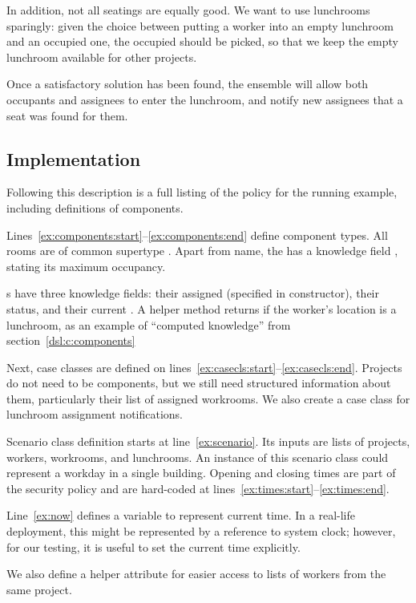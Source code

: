 In addition, not all seatings are equally good. We want to use lunchrooms sparingly:
given the choice between putting a worker into an empty lunchroom and an occupied one,
the occupied should be picked, so that we keep the empty lunchroom available for other
projects.

Once a satisfactory solution has been found, the ensemble will allow both occupants and
assignees to enter the lunchroom, and notify new assignees that a seat was found for
them.


\subsection{Implementation}

Following this description is a full listing of the policy for the running example,
including definitions of components.

Lines~\ref{ex:components:start}--\ref{ex:components:end} define component types. All
rooms are of common supertype . Apart from name, the  has a
knowledge field , stating its maximum occupancy.

s have three knowledge fields: their assigned  (specified in
constructor), their  status, and their current . A helper method
 returns  if the worker's location is a lunchroom, as an
example of ``computed knowledge'' from section~\ref{dsl:c:components}

Next, case classes are defined on lines~\ref{ex:casecls:start}--\ref{ex:casecls:end}.
Projects do not need to be components, but we still need structured information about
them, particularly their list of assigned workrooms. We also create a case class for
lunchroom assignment notifications.

Scenario class definition starts at line~\ref{ex:scenario}. Its inputs are lists of
projects, workers, workrooms, and lunchrooms. An instance of this scenario class could
represent a workday in a single building. Opening and closing times are part of the
security policy and are hard-coded at lines~\ref{ex:times:start}--\ref{ex:times:end}.

Line~\ref{ex:now} defines a variable to represent current time. In a real-life
deployment, this might be represented by a reference to system clock; however, for our
testing, it is useful to set the current time explicitly.

We also define a helper attribute  for easier access to lists of
workers from the same project.

